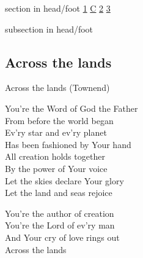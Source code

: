 \documentclass{beamer}
\begin{document}
{
{ 
 {
 \begin{beamercolorbox}[ht=4.5ex,dp=1.5ex,%
      leftskip=.3cm,rightskip=.3cm plus1fil]{section in head/foot}
 \fontsize{12}{25}\selectfont 
\hyperlink{Across the lands["You're the Word of God the Father"](Townend)1}{1}
\hyperlink{Across the lands["You're the Word of God the Father"](Townend)C}{C}
\hyperlink{Across the lands["You're the Word of God the Father"](Townend)2}{2}
\hyperlink{Across the lands["You're the Word of God the Father"](Townend)3}{3}
 
 \end{beamercolorbox}%
  \begin{beamercolorbox}[ht=2.5ex,dp=1.125ex,%
   leftskip=.3cm,rightskip=.3cm plus1fil]{subsection in head/foot}
   \insertauthor
 \end{beamercolorbox}%
 }
}
\subsection{ Across the lands }

\hypertarget{Across the lands["You're the Word of God the Father"](Townend)1}{}
\begin{frame}{Across the lands (Townend)}
\fontsize{ 18 }{ 23 }\selectfont

You're the Word of God the Father\\ 
From before the world began\\ 
Ev'ry star and ev'ry planet\\ 
Has been fashioned by Your hand\\ 
All creation holds together\\ 
By the power of Your voice\\ 
Let the skies declare Your glory\\ 
Let the land and seas rejoice 

\end{frame}

\hypertarget{Across the lands["You're the Word of God the Father"](Townend)C}{}
\begin{frame}{}
\fontsize{ 18 }{ 23 }\selectfont

You're the author of creation\\ 
You're the Lord of ev'ry man\\ 
And Your cry of love rings out\\ 
Across the lands 

\end{frame}

}
\end{document}
